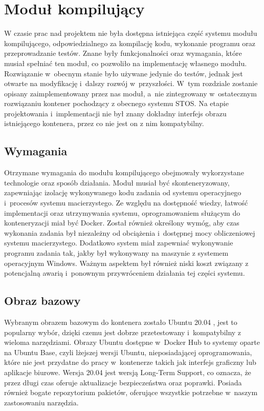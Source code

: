 \section{Moduł kompilujący}
W czasie prac nad projektem nie była dostępna istniejąca część systemu modułu kompilującego, odpowiedzialnego za kompilację kodu, wykonanie programu oraz przeprowadzanie testów. Znane były funkcjonalności oraz wymagania, które musiał spełniać ten moduł, co pozwoliło na implementację własnego modułu. Rozwiązanie w~obecnym stanie było używane jedynie do testów, jednak jest otwarte na modyfikację i~dalszy rozwój w~przyszłości. W~tym rozdziale zostanie opisany zaimplementowany przez nas moduł, a~nie zintegrowany w~ostatecznym rozwiązaniu kontener pochodzący z obecnego systemu STOS. Na etapie projektowania i~implementacji nie był znany dokładny interfejs obrazu istniejącego kontenera, przez co nie jest on z nim kompatybilny. 

\subsection{Wymagania}
Otrzymane wymagania do modułu kompilującego obejmowały wykorzystane technologie oraz sposób działania. Moduł musiał być skonteneryzowany, zapewniając izolację wykonywanego kodu zadania od systemu operacyjnego i~procesów systemu macierzystego. Ze względu na dostępność wiedzy, łatwość implementacji oraz utrzymywania systemu, oprogramowaniem służącym do konteneryzacji miał być Docker. Został również określony wymóg, aby czas wykonania zadania był niezależny od obciążenia i~dostępnej mocy obliczeniowej systemu macierzystego. Dodatkowo system miał zapewniać wykonywanie programu zadania tak, jakby był wykonywany na maszynie z systemem operacyjnym Windows. Ważnym aspektem był również niski koszt związany z potencjalną awarią i~ponownym przywróceniem działania tej części systemu.

\subsection{Obraz bazowy}
Wybranym obrazem bazowym do kontenera zostało Ubuntu 20.04 \cite{linuxUbuntu}, jest to popularny wybór, dzięki czemu jest dobrze przetestowany i~kompatybilny z wieloma narzędziami. Obrazy Ubuntu dostępne w~Docker Hub to systemy oparte na Ubuntu Base, czyli lżejszej wersji Ubuntu, nieposiadającej oprogramowania, które nie jest przydatne do pracy w~kontenerze takich jak interfejs graficzny lub aplikacje biurowe. Wersja 20.04 jest wersją Long-Term Support, co oznacza, że przez długi czas oferuje aktualizacje bezpieczeństwa oraz poprawki. Posiada również bogate repozytorium pakietów, oferujące wszystkie potrzebne w~naszym zastosowaniu narzędzia.

